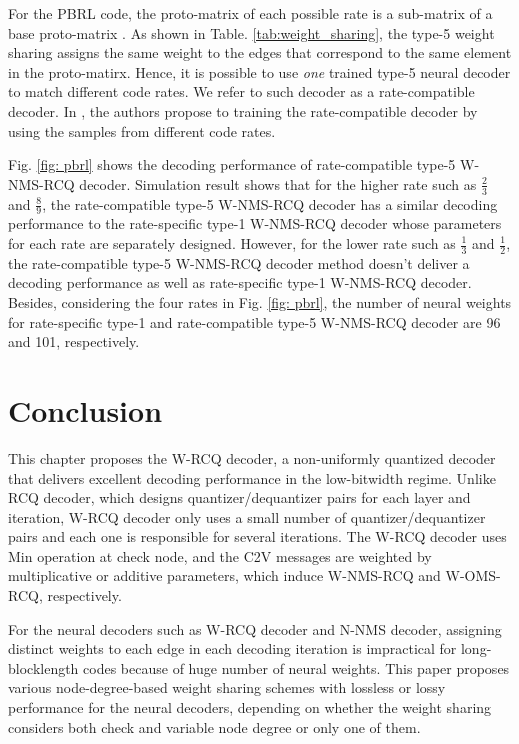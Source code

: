 \documentclass [PhD] {uclathes}
\begin{document}
For the PBRL code, the proto-matrix of each possible rate is a sub-matrix of a base proto-matrix \cite{PBRL}. As shown in Table. \ref{tab:weight_sharing}, the type-5 weight sharing assigns the same weight to the edges that correspond to the same element in the proto-matirx. Hence, it is possible to use \emph{one} trained type-5 neural decoder to match different code rates. We refer to such decoder as a rate-compatible decoder. In \cite{dai2021learning}, the authors propose to training the rate-compatible decoder by using the samples from different code rates. 

Fig. \ref{fig: pbrl} shows the decoding performance of rate-compatible type-5 W-NMS-RCQ decoder. Simulation result shows that for the higher rate such as $\frac{2}{3}$ and $\frac{8}{9}$, the rate-compatible type-5 W-NMS-RCQ decoder has a similar decoding performance to the rate-specific type-1 W-NMS-RCQ decoder whose parameters for each rate  are separately designed.  However, for the lower rate such as $\frac{1}{3}$ and $\frac{1}{2}$, the rate-compatible type-5 W-NMS-RCQ decoder method doesn't deliver a decoding performance as well as rate-specific type-1 W-NMS-RCQ decoder.
Besides, considering the four rates in Fig. \ref{fig: pbrl}, the number of neural weights for rate-specific type-1 and rate-compatible type-5  W-NMS-RCQ decoder are 96 and 101, respectively.

\section{Conclusion}\label{sec: conclusion_c2}
This chapter proposes the W-RCQ decoder, a non-uniformly quantized decoder that delivers excellent decoding performance in the low-bitwidth regime.
Unlike RCQ decoder, which designs quantizer/dequantizer pairs for each layer and iteration, W-RCQ decoder only uses a small number of quantizer/dequantizer pairs and each one is responsible for several iterations. 
The W-RCQ decoder uses Min operation at check node, and the C2V messages are weighted by multiplicative or additive parameters, which induce W-NMS-RCQ and W-OMS-RCQ, respectively. 

For the neural decoders such as W-RCQ decoder and N-NMS decoder, assigning distinct weights to each edge in each decoding iteration is impractical for long-blocklength codes because of huge number of neural weights.
This paper proposes various node-degree-based weight sharing schemes with  lossless or lossy performance for the neural decoders, depending on whether the weight sharing considers both check and variable node degree or only one of them. 
\end{document}
